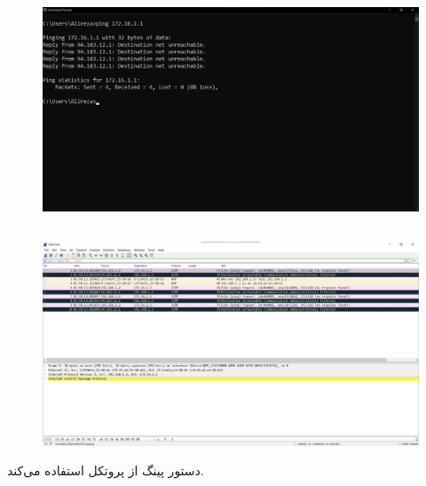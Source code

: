 \documentclass{article}
\begin{document}
\section{}
\subsection{}
\subsection{}
\subsection{}
\begin{figure}[H]
    \centering
    \includegraphics[width=1.0\textwidth]{figures/57.jpg}
    \caption{}
    \label{fig:fig1}
\end{figure}
\subsection{}
\begin{figure}[H]
    \centering
    \includegraphics[width=1.0\textwidth]{figures/58.jpg}
    \caption{}
    \label{fig:fig1}
\end{figure}
دستور پینگ از پروتکل  استفاده می‌کند.
\end{document}
